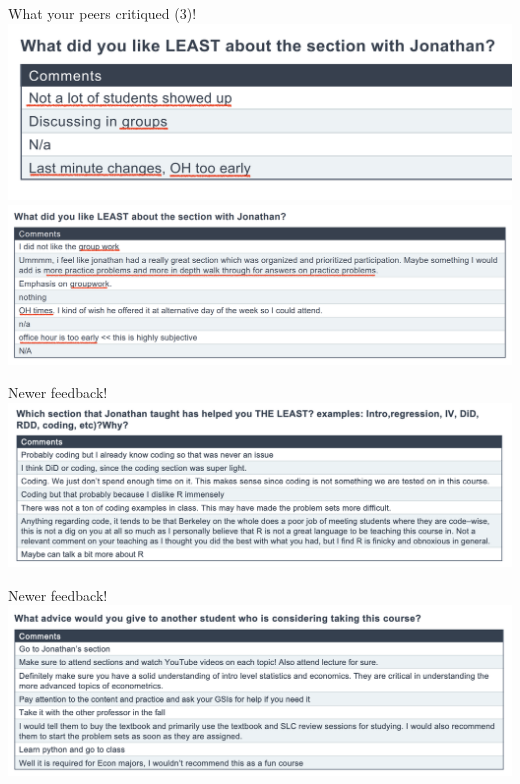 \documentclass[11pt]{beamer}
\begin{document}
\begin{frame}{What your peers critiqued (3)!}
\includegraphics[width=\textwidth]{figures/Feedback/feedback_f2023_1.png}
\includegraphics[width=\textwidth]{figures/Feedback/feedback_f2023_2.png}
\end{frame}




\begin{frame}{Newer feedback!}
\includegraphics[width=\textwidth]{figures/Feedback/advice2024a.png}
\end{frame}


\begin{frame}{Newer feedback!}
\includegraphics[width=\textwidth]{figures/Feedback/advice2024b.png}
\end{frame}
\end{document}
